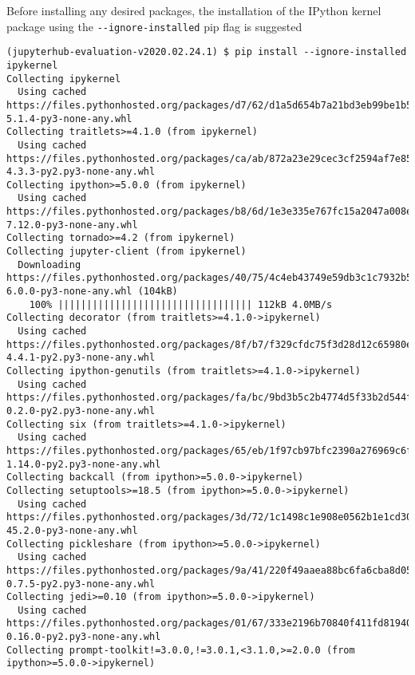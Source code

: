 Before installing any desired packages, the installation of the IPython kernel package using the \verb|--ignore-installed| pip flag is suggested
%
\begin{verbatim}
(jupyterhub-evaluation-v2020.02.24.1) $ pip install --ignore-installed ipykernel
Collecting ipykernel
  Using cached https://files.pythonhosted.org/packages/d7/62/d1a5d654b7a21bd3eb99be1b59a608cc18a7a08ed88495457a87c40a0495/ipykernel-5.1.4-py3-none-any.whl
Collecting traitlets>=4.1.0 (from ipykernel)
  Using cached https://files.pythonhosted.org/packages/ca/ab/872a23e29cec3cf2594af7e857f18b687ad21039c1f9b922fac5b9b142d5/traitlets-4.3.3-py2.py3-none-any.whl
Collecting ipython>=5.0.0 (from ipykernel)
  Using cached https://files.pythonhosted.org/packages/b8/6d/1e3e335e767fc15a2047a008e27df31aa8bcf11c6f3805d03abefc69aa88/ipython-7.12.0-py3-none-any.whl
Collecting tornado>=4.2 (from ipykernel)
Collecting jupyter-client (from ipykernel)
  Downloading https://files.pythonhosted.org/packages/40/75/4c4eb43749e59db3c1c7932b50eaf8c4b8219b1b5644fe379ea796f8dbe5/jupyter_client-6.0.0-py3-none-any.whl (104kB)
    100% |||||||||||||||||||||||||||||||||| 112kB 4.0MB/s
Collecting decorator (from traitlets>=4.1.0->ipykernel)
  Using cached https://files.pythonhosted.org/packages/8f/b7/f329cfdc75f3d28d12c65980e4469e2fa373f1953f5df6e370e84ea2e875/decorator-4.4.1-py2.py3-none-any.whl
Collecting ipython-genutils (from traitlets>=4.1.0->ipykernel)
  Using cached https://files.pythonhosted.org/packages/fa/bc/9bd3b5c2b4774d5f33b2d544f1460be9df7df2fe42f352135381c347c69a/ipython_genutils-0.2.0-py2.py3-none-any.whl
Collecting six (from traitlets>=4.1.0->ipykernel)
  Using cached https://files.pythonhosted.org/packages/65/eb/1f97cb97bfc2390a276969c6fae16075da282f5058082d4cb10c6c5c1dba/six-1.14.0-py2.py3-none-any.whl
Collecting backcall (from ipython>=5.0.0->ipykernel)
Collecting setuptools>=18.5 (from ipython>=5.0.0->ipykernel)
  Using cached https://files.pythonhosted.org/packages/3d/72/1c1498c1e908e0562b1e1cd30012580baa7d33b5b0ffdbeb5fde2462cc71/setuptools-45.2.0-py3-none-any.whl
Collecting pickleshare (from ipython>=5.0.0->ipykernel)
  Using cached https://files.pythonhosted.org/packages/9a/41/220f49aaea88bc6fa6cba8d05ecf24676326156c23b991e80b3f2fc24c77/pickleshare-0.7.5-py2.py3-none-any.whl
Collecting jedi>=0.10 (from ipython>=5.0.0->ipykernel)
  Using cached https://files.pythonhosted.org/packages/01/67/333e2196b70840f411fd819407b4e98aa3150c2bd24c52154a451f912ef2/jedi-0.16.0-py2.py3-none-any.whl
Collecting prompt-toolkit!=3.0.0,!=3.0.1,<3.1.0,>=2.0.0 (from ipython>=5.0.0->ipykernel)

\end{verbatim}
